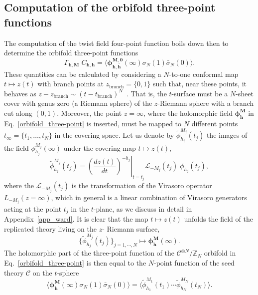 \documentclass[a4paper,11pt]{article}
\begin{document}
\subsection{Computation of the orbifold three-point functions}
The computation of the twist field four-point function boils down then to determine the 
orbifold three-point functions
\begin{equation}\label{orbifold_three-point}
 \Gamma_{\boldsymbol{h},\boldsymbol{M}} \;C_{\boldsymbol{h},\boldsymbol{h}} = \langle \boldsymbol{\phi}^{\boldsymbol{M},\boldsymbol{0}}_{\boldsymbol{h},\boldsymbol{\bar{h}}}(\infty) \sigma_{N}(1)\bar{\sigma}_{N}(0)\rangle.
\end{equation}
These quantities can be calculated by considering a $N$-to-one conformal map
$t\mapsto z(t)$ with branch points at $z_{\text{branch}}=\{0, 1\}$ such that, 
near these points, it behaves as $z-z_{\text{branch}}\sim (t-t_{\text{branch}})^N$~\cite{Lunin}.
That is, the $t$-surface must be a $N$-sheet cover with genus zero (a Riemann sphere) of the $z$-Riemann sphere with a branch cut along 
$(0,1)$.  Moreover, the point $z=\infty$, where the holomorphic field $\boldsymbol{\phi}^{\boldsymbol{M}}_{\boldsymbol{h}}$
in Eq.~\eqref{orbifold_three-point} is inserted, must be mapped to $N$ different points $t_\infty=\{t_1, \dots, t_N\}$ in 
the covering space. Let us denote by $\tilde{\phi}_{h_j}^{M_j}(t_j)$ the images
of the field $\phi_{h_j}^{M_j}(\infty)$ under the covering map $t\mapsto z(t)$,
\begin{equation}
\label{Jac}
\tilde{\phi}_{h_j}^{M_j}(t_j) = \left.\left(\frac{d z(t)}{d t}
 \right)^{-h_j}\right|_{t=t_j} \mathcal{L}_{-M_j}(t_j)\;\phi_{h_j} (t_j),
\end{equation}
where the $\mathcal{L}_{-M_j}(t_j)$ is the transformation of the Virasoro operator
$L_{-M_j}(z=\infty)$, which in general is a linear combination of Virasoro generators
acting at the point $t_j$ in the $t$-plane, as we discuss in detail in Appendix~\ref{app_ward}.
It is clear that the map $t\mapsto z(t)$ unfolds the field of the replicated theory living on the $z$- Riemann surface,
\begin{equation}
\{\tilde{\phi}_{h_j}^{M_j}(t_j)\}_{j=1,\cdots,N}\mapsto \boldsymbol{\phi}_{\boldsymbol{h}}^{\boldsymbol{M}}(\infty).
\end{equation}
The holomorphic part of the three-point function of the $\mathcal{C}^{\otimes N}/\mathbb{Z}_N$ orbifold in Eq.~\eqref{orbifold_three-point}
is then equal to the $N$-point function of the seed theory $\mathcal{C}$ on the $t$-sphere
\begin{equation}\label{N-point}
\langle \boldsymbol{\phi}^{\boldsymbol{M}}_{\boldsymbol{h}}(\infty) \sigma_{N}(1)\bar{\sigma}_{N}(0)\rangle=\langle \tilde{\phi}^{M_1}_{h_1}(t_1)\cdots\tilde{\phi}_{h_N}^{M_N}(t_N)\rangle.
\end{equation}
\end{document}
